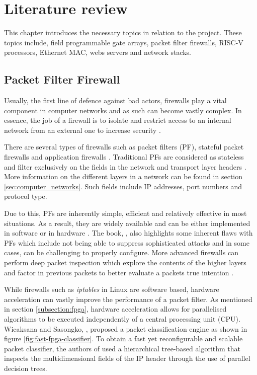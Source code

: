 \chapter[Literature review]{Literature review }
\label{Chap:label}	%
\pagestyle{headings}

This chapter introduces the necessary topics in relation to the project. These topics include, field programmable gate arrays, packet filter firewalls, RISC-V processors, Ethernet MAC, webs servers and network stacks.  








\section{Packet Filter Firewall}

Usually, the first line of defence against bad actors, firewalls play a vital component in computer networks and as such can become vastly complex. 
In essence, the job of a firewall is to isolate and restrict access to an internal network from an external one to increase security \cite{BuildingInternetFirewalls}.

There are several types of firewalls such as packet filters (PF), stateful packet firewalls and application firewalls \cite{FirewallsBook}. 
Traditional PFs are considered as stateless and filter exclusively on the fields in the network and transport layer headers \cite{FirewallsBook}. More information on the different layers in a network can be found in section \ref{sec:computer_networks}. Such fields include IP addresses, port numbers and protocol type.

Due to this, PFs are inherently simple, efficient and relatively effective in most situations. As a result, they are widely available and can be either implemented in software or in hardware \cite{BuildingInternetFirewalls}. The book, \cite{BuildingInternetFirewalls}, also highlights some inherent flaws with PFs which include not being able to suppress sophisticated attacks and in some cases, can be challenging to properly configure. More advanced firewalls can perform deep packet inspection which explore the contents of the higher layers and factor in previous packets to better evaluate a packets true intention \cite{FirewallsBook}. 

While firewalls such as \textit{iptables} in Linux are software based, hardware acceleration can vastly improve the performance of a packet filter. As mentioned in section \ref{subsection:fpga}, hardware acceleration allows for parallelised algorithms to be executed independently of a central processing unit (CPU). Wicaksana and Sasongko, \cite{FastRecongifFPGAFirewall}, proposed a packet classification engine as shown in figure \ref{fig:fast-fpga-classifier}. To obtain a fast yet reconfigurable and scalable packet classifier, the authors of \cite{FastRecongifFPGAFirewall} used a hierarchical tree-based algorithm that inspects the multidimensional fields of the IP header through the use of parallel decision trees.

